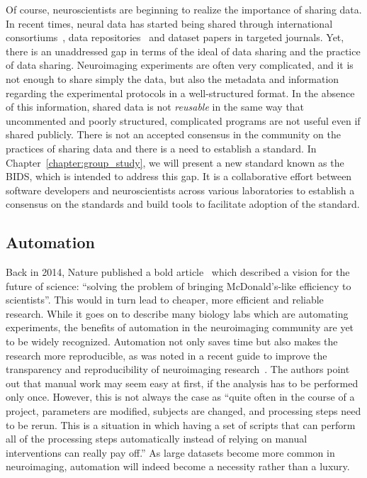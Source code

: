 Of course, neuroscientists are beginning to realize the importance of sharing data. In recent times, neural data has started being shared through international consortiums~\citep{van2013wu, ollier2005uk}, data repositories~\citep{poldrack2013toward, gorgolewski2015neurovault} and dataset papers in targeted journals. Yet, there is an unaddressed gap in terms of the ideal of data sharing and the practice of data sharing. Neuroimaging experiments are often very complicated, and it is not enough to share simply the data, but also the metadata and information regarding the experimental protocols in a well-structured format. 
In the absence of this information, shared data is not \emph{reusable} in the same way that uncommented and poorly structured, complicated programs are not useful even if shared publicly. 
There is not an accepted consensus in the community on the practices of sharing data and there is a need to establish a standard. 
In Chapter~\ref{chapter:group_study}, we will present a new standard known as the \ac{BIDS}, which is intended to address this gap. 
It is a collaborative effort between software developers and neuroscientists across various laboratories to establish a consensus on the standards and build tools to facilitate adoption of the standard.

\subsection*{Automation}
\label{sec:sommaire:automation}

Back in 2014, Nature published a bold article~\citep{hayden2014automated} which described a vision for the future of science: ``solving the problem of bringing McDonald's-like efficiency to scientists''. This would in turn lead to cheaper, more efficient and reliable research. While it goes on to describe many biology labs which are automating experiments, the benefits of automation in the neuroimaging community are yet to be widely recognized. Automation not only saves time but also makes the research more reproducible, as was noted in a recent guide to improve the transparency and reproducibility of neuroimaging research~\citep{gorgolewski2016practical}. The authors point out that manual work may seem easy at first, if the analysis has to be performed only once. However, this is not always the case as ``quite often in the course of a project, parameters are modified, subjects are changed, and processing steps need to be rerun. This is a situation in which having a set of scripts that can perform all of the processing steps automatically instead of relying on manual interventions can really pay off.'' As large datasets become more common in neuroimaging, automation will indeed become a necessity rather than a luxury.


